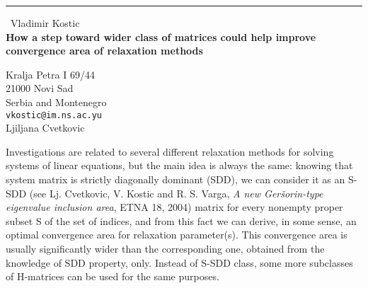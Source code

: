 \documentclass{report}
\begin{document}
\begin{center}
\rule{6in}{1pt} \
{\large Vladimir Kostic \\
{\bf How a step toward wider class of matrices could help improve convergence area of relaxation methods}}

Kralja Petra I 69/44 \\ 21000 Novi Sad \\ Serbia and Montenegro
\\
{\tt vkostic@im.ns.ac.yu}\\
Ljiljana Cvetkovic\end{center}

Investigations are related to several different relaxation methods for
solving systems of linear equations, but the main idea is always the
same: knowing that system matrix is strictly diagonally dominant (SDD),
we can consider it as an S-SDD (see Lj. Cvetkovic, V. Kostic and R. S.
Varga, {\em A new Ger\v sorin-type eigenvalue inclusion area}, ETNA 18,
2004) matrix for every nonempty proper subset S of the set of indices,
and from this fact we can derive, in some sense, an optimal convergence
area for relaxation parameter(s). This convergence area is usually
significantly wider than the corresponding one, obtained from the
knowledge of SDD property, only. Instead of S-SDD class, some more
subclasses of H-matrices can be used for the same purposes.
\end{document}
